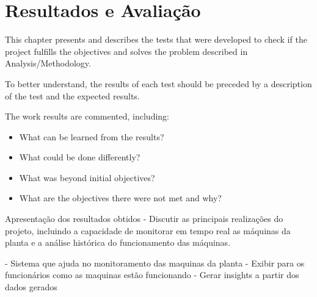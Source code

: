 \chapter{Resultados e Avaliação}\label{cap:conclusions}






This chapter presents and describes the tests that were developed to check if the project fulfills the objectives and solves the problem described in Analysis/Methodology.

To better understand, the results of each test should be preceded by a description of the test and the expected results.

The work results are commented, including:

\begin{itemize}
	\item  What can be learned from the results?
	\item What could be done differently? 
	\item What was beyond initial objectives?
	\item What are the objectives there were not met and why?
\end{itemize}



Apresentação dos resultados obtidos - Discutir as principais realizações do projeto, incluindo a capacidade de monitorar em tempo real as máquinas da planta e a análise histórica do funcionamento das máquinas.

- Sistema que ajuda no monitoramento das maquinas da planta
- Exibir para os funcionários como as maquinas estão funcionando
- Gerar insights a partir dos dados gerados
